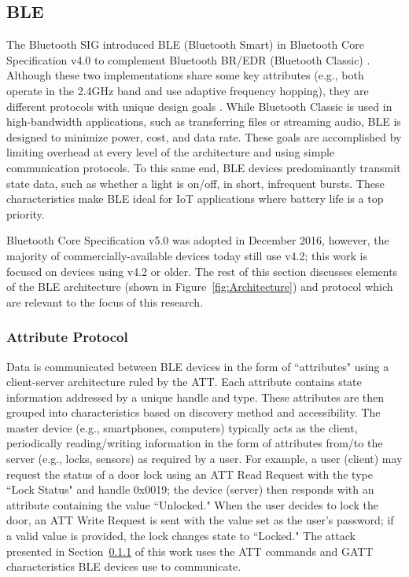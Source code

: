 \documentclass[12pt,letterpaper,oneside]{book}
\begin{document}
			\subsection{\acf{BLE}}
			The Bluetooth \ac{SIG} introduced \ac{BLE} (Bluetooth Smart) in Bluetooth Core Specification v4.0 to complement Bluetooth \ac{BR/EDR} (Bluetooth Classic) \cite{sig4.0}. Although these two implementations share some key attributes (e.g., both operate in the 2.4GHz band and use adaptive frequency hopping), they are different protocols with unique design goals \cite{rHeydon}. While Bluetooth Classic is used in high-bandwidth applications, such as transferring files or streaming audio, \ac{BLE} is designed to minimize power, cost, and data rate. These goals are accomplished by limiting overhead at every level of the architecture and using simple communication protocols. To this same end, \ac{BLE} devices predominantly transmit state data, such as whether a light is on/off, in short, infrequent bursts. These characteristics make \ac{BLE} ideal for \ac{IoT} applications where battery life is a top priority. 
			
			Bluetooth Core Specification v5.0 was adopted in December 2016, however, the majority of commercially-available devices today still use v4.2; this work is focused on devices using v4.2 or older. The rest of this section discusses elements of the \ac{BLE} architecture (shown in Figure~\ref{fig:Architecture}) and protocol which are relevant to the focus of this research.
			
			\figArchitecture
			
				\subsubsection{Attribute Protocol}
				Data is communicated between \ac{BLE} devices in the form of ``attributes" using a client-server architecture ruled by the \ac{ATT}. Each attribute contains state information addressed by a unique handle and type. These attributes are then grouped into characteristics based on discovery method and accessibility. The master device (e.g., smartphones, computers) typically acts as the client, periodically reading/writing information in the form of attributes from/to the server (e.g., locks, sensors) as required by a user. For example, a user (client) may request the status of a door lock using an \ac{ATT} Read Request with the type ``Lock Status" and handle 0x0019; the device (server) then responds with an attribute containing the value ``Unlocked." When the user decides to lock the door, an \ac{ATT} Write Request is sent with the value set as the user's password; if a valid value is provided, the lock changes state to ``Locked." The attack presented in Section~\ref{} of this work uses the \ac{ATT} commands and \ac{GATT} characteristics \ac{BLE} devices use to communicate.
				
\end{document}
